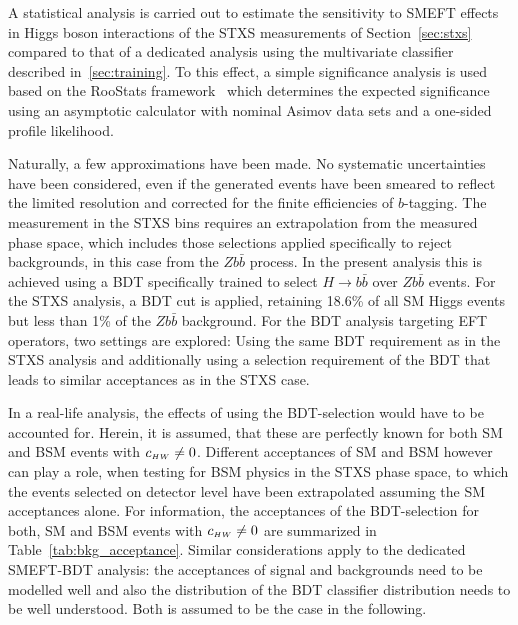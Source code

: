 A statistical analysis is carried out to estimate the sensitivity to SMEFT effects in Higgs boson interactions of the STXS measurements of Section~\ref{sec:stxs} compared to that of a dedicated analysis using the multivariate classifier described in~\ref{sec:training}. To this effect, a simple significance analysis is used based on the {\sc RooStats} framework~\cite{Moneta:2010pm} which determines the expected significance using an asymptotic calculator with nominal Asimov data sets and a one-sided profile likelihood. 

Naturally, a few approximations have been made. No systematic uncertainties have been considered, even if the generated events have been smeared to reflect the limited resolution and corrected for the finite efficiencies of $b$-tagging. The measurement in the STXS bins requires an extrapolation from the measured phase space, which includes those selections applied specifically to reject backgrounds, in this case from the $Z b\bar{b}$ process. In the present analysis this is achieved using a BDT specifically trained to select $H\to b\bar{b}$ over $Z b\bar{b}$ events. For the STXS analysis, a BDT cut is applied, retaining 18.6\% of all SM Higgs events but less than 1\% of the $Z b\bar{b}$ background. For the BDT analysis targeting EFT operators, two settings are explored: Using the same BDT requirement as in the STXS analysis and additionally using a selection requirement of the BDT that leads to similar acceptances as in the STXS case. 

In a real-life analysis, the effects of using the BDT-selection would have to be accounted for. Herein, it is assumed, that these are perfectly known for both SM and BSM events with $c_{\scriptscriptstyle HW} \neq 0$. Different acceptances of SM and BSM however can play a role, when testing for BSM physics in the STXS phase space, to which the events selected on detector level have been extrapolated assuming the SM acceptances alone. For information, the acceptances of the BDT-selection for both, SM and BSM events with $c_{\scriptscriptstyle HW} \neq 0$ are summarized in Table~\ref{tab:bkg_acceptance}. Similar considerations apply to the dedicated SMEFT-BDT analysis: the acceptances of signal and backgrounds need to be modelled well and also the distribution of the BDT classifier distribution needs to be well understood. Both is assumed to be the case in the following.

